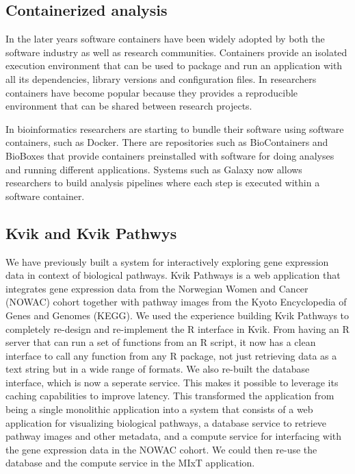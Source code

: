 \subsection*{Containerized analysis} 
In the later years software containers have been widely adopted by both
the software industry as well as research communities. Containers provide an
isolated execution environment that can be used to package and run
an application with all its dependencies, library versions and configuration
files. In researchers containers have become popular because they provides a
reproducible environment that can be shared between research projects. 

In bioinformatics researchers are starting to bundle their software using
software containers, such as Docker. There are repositories such as
BioContainers\cite{dabiocontainers} and BioBoxes\cite{Belmann2015} that provide
containers preinstalled with software for doing analyses and running different
applications. Systems such as Galaxy now allows researchers to build analysis
pipelines where each step is executed within a software container. 


\subsection*{Kvik and Kvik Pathwys}
We have previously built a system for interactively exploring gene expression
data in context of  biological pathways.\cite{fjukstad2015kvik} Kvik Pathways is
a web application that integrates gene expression data from the Norwegian Women
and Cancer (NOWAC) cohort together with pathway images from the Kyoto
Encyclopedia of Genes and Genomes (KEGG). We used the experience building Kvik
Pathways to completely re-design and re-implement
the R interface in Kvik. From having an R server that can run a set of functions
from an R script, it now has a clean interface to call any function from any R
package, not just retrieving data as a text string but in a wide range of
formats. We also re-built the database interface, which is now a seperate
service. This makes it possible to leverage its caching capabilities to improve
latency. This transformed the application from being a single monolithic
application into a system that
consists of a web application for visualizing biological pathways, a database
service to retrieve pathway images and other metadata, and a compute service for
interfacing with the gene expression data in the NOWAC cohort. We could then
re-use the database and the compute service in the MIxT application. 

